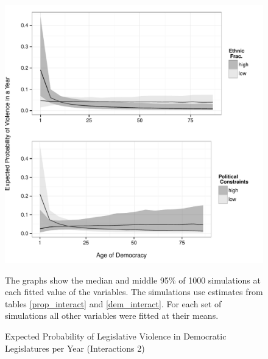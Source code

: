 \documentclass[a4paper]{article}\usepackage[]{graphicx}\usepackage[]{color}
\newenvironment{knitrout}{}{} %
\begin{document}
\begin{figure}
    \begin{center}
\begin{knitrout}
\color{fgcolor}
\includegraphics[width=0.95\linewidth]{figure/predProInteract2-1} 

\end{knitrout}

    \end{center}
    \caption{Expected Probability of Legislative Violence in Democratic Legislatures per Year (Interactions 2)}
    \label{interact_plots2}
    \begin{singlespace}
      {\scriptsize{The graphs show the median and middle 95\% of 1000 simulations at each fitted value of the variables. The simulations use estimates from tables \ref{prop_interact} and \ref{dem_interact}. For each set of simulations all other variables were fitted at their means.}}
    \end{singlespace}
\end{figure}
\end{document}

